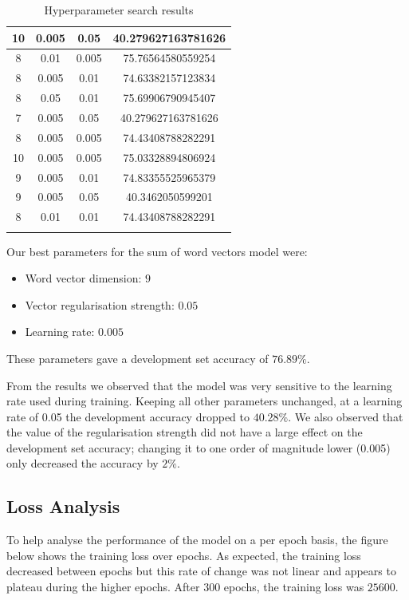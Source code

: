\documentclass{article} %
\begin{document}
\begin{table}[htb]
{\begin{tabular}{|c|c|c|c|}
10 & 0.005 & 0.05 & 40.279627163781626 \\ \hline
8 & 0.01 & 0.005 & 75.76564580559254 \\ \hline
8 & 0.005 & 0.01 & 74.63382157123834 \\ \hline
8 & 0.05 & 0.01 & 75.69906790945407 \\ \hline
7 & 0.005 & 0.05 & 40.279627163781626 \\ \hline
8 & 0.005 & 0.005 & 74.43408788282291 \\ \hline
10 & 0.005 & 0.005 & 75.03328894806924 \\ \hline
9 & 0.005 & 0.01 & 74.83355525965379 \\ \hline
9 & 0.005 & 0.05 & 40.3462050599201 \\ \hline
8 & 0.01 & 0.01 & 74.43408788282291 \\	 \hline
\label{mainresults}
\end{tabular}
}
\caption{Hyperparameter search results}
\end{table}

Our best parameters for the sum of word vectors model were:

\begin{itemize}

\item Word vector dimension: $9$
\item Vector regularisation strength: $0.05$
\item Learning rate: $0.005$

\end{itemize}

These parameters gave a development set accuracy of $76.89\%$.

From the results we observed that the model was very sensitive to the learning rate used during training. Keeping all other parameters unchanged, at a learning rate of 0.05 the development accuracy dropped to $40.28\%$. We also observed that the value of the regularisation strength did not have a large effect on the development set accuracy; changing it to one order of magnitude lower (0.005) only decreased the accuracy by $2\%$.

\subsection{Loss Analysis}

To help analyse the performance of the model on a per epoch basis, the figure below shows the training loss over epochs. As expected, the training loss decreased between epochs but this rate of change was not linear and appears to plateau during the higher epochs. 
After 300 epochs, the training loss was $25600$.
\end{document}
